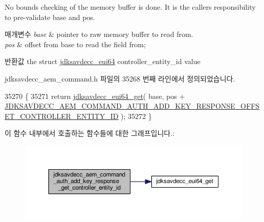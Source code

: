 No bounds checking of the memory buffer is done. It is the caller\textquotesingle{}s responsibility to pre-\/validate base and pos.


\begin{DoxyParams}{매개변수}
{\em base} & pointer to raw memory buffer to read from. \\
\hline
{\em pos} & offset from base to read the field from; \\
\hline
\end{DoxyParams}
\begin{DoxyReturn}{반환값}
the struct \hyperlink{structjdksavdecc__eui64}{jdksavdecc\+\_\+eui64} controller\+\_\+entity\+\_\+id value 
\end{DoxyReturn}


jdksavdecc\+\_\+aem\+\_\+command.\+h 파일의 35268 번째 라인에서 정의되었습니다.


\begin{DoxyCode}
35270 \{
35271     \textcolor{keywordflow}{return} \hyperlink{group__eui64_ga2652311a25a6b91cddbed75c108c7031}{jdksavdecc\_eui64\_get}( base, pos + 
      \hyperlink{group__command__auth__add__key__response_gaf43033ba7c4319d2dbe68f097eaf79d3}{JDKSAVDECC\_AEM\_COMMAND\_AUTH\_ADD\_KEY\_RESPONSE\_OFFSET\_CONTROLLER\_ENTITY\_ID}
       );
35272 \}
\end{DoxyCode}


이 함수 내부에서 호출하는 함수들에 대한 그래프입니다.\+:
\nopagebreak
\begin{figure}[H]
\begin{center}
\leavevmode
\includegraphics[width=350pt]{group__command__auth__add__key__response_gaf06a097463dc7c4c9fbf2d8f3a3c441b_cgraph}
\end{center}
\end{figure}


